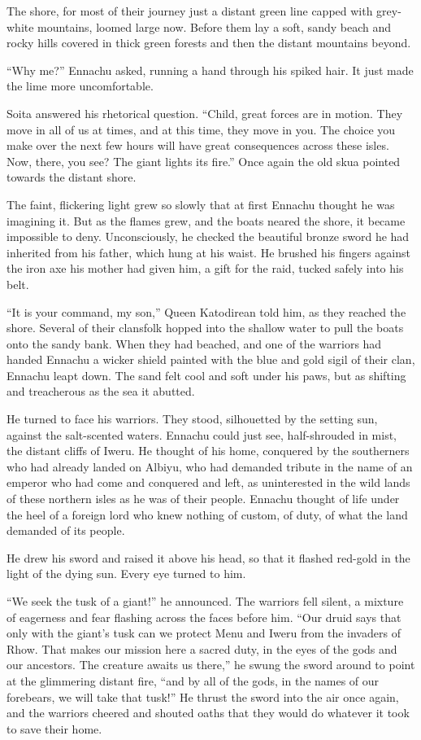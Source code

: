 The shore, for most of their journey just a distant green line capped with grey-white mountains, loomed large now. Before them lay a soft, sandy beach and rocky hills covered in thick green forests and then the distant mountains beyond.

``Why me?'' Ennachu asked, running a hand through his spiked hair. It just made the lime more uncomfortable.

Soita answered his rhetorical question. ``Child, great forces are in motion. They move in all of us at times, and at this time, they move in you. The choice you make over the next few hours will have great consequences across these isles. Now, there, you see? The giant lights its fire.'' Once again the old skua pointed towards the distant shore.

The faint, flickering light grew so slowly that at first Ennachu thought he was imagining it. But as the flames grew, and the boats neared the shore, it became impossible to deny. Unconsciously, he checked the beautiful bronze sword he had inherited from his father, which hung at his waist. He brushed his fingers against the iron axe his mother had given him, a gift for the raid, tucked safely into his belt.

``It is your command, my son,'' Queen Katodirean told him, as they reached the shore. Several of their clansfolk hopped into the shallow water to pull the boats onto the sandy bank. When they had beached, and one of the warriors had handed Ennachu a wicker shield painted with the blue and gold sigil of their clan, Ennachu leapt down. The sand felt cool and soft under his paws, but as shifting and treacherous as the sea it abutted.

He turned to face his warriors. They stood, silhouetted by the setting sun, against the salt-scented waters. Ennachu could just see, half-shrouded in mist, the distant cliffs of Iweru. He thought of his home, conquered by the southerners who had already landed on Albiyu, who had demanded tribute in the name of an emperor who had come and conquered and left, as uninterested in the wild lands of these northern isles as he was of their people. Ennachu thought of life under the heel of a foreign lord who knew nothing of custom, of duty, of what the land demanded of its people.

He drew his sword and raised it above his head, so that it flashed red-gold in the light of the dying sun. Every eye turned to him.

``We seek the tusk of a giant!'' he announced. The warriors fell silent, a mixture of eagerness and fear flashing across the faces before him. ``Our druid says that only with the giant's tusk can we protect Menu and Iweru from the invaders of Rhow. That makes our mission here a sacred duty, in the eyes of the gods and our ancestors. The creature awaits us there,'' he swung the sword around to point at the glimmering distant fire, ``and by all of the gods, in the names of our forebears, we will take that tusk!'' He thrust the sword into the air once again, and the warriors cheered and shouted oaths that they would do whatever it took to save their home.

